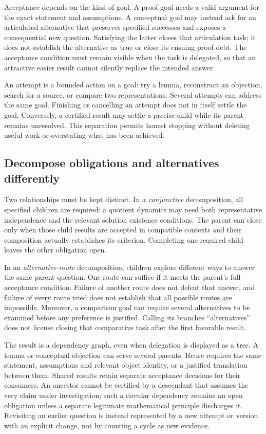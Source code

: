 Acceptance depends on the kind of goal. A proof goal needs a valid argument
for the exact statement and assumptions. A conceptual goal may instead ask for
an articulated alternative that preserves specified successes and exposes a
consequential new question. Satisfying the latter closes that articulation task;
it does not establish the alternative as true or close its ensuing proof debt.
The acceptance condition must remain visible when the task is delegated, so
that an attractive easier result cannot silently replace the intended answer.

An attempt is a bounded action on a goal: try a lemma, reconstruct an objection,
search for a source, or compare two representations. Several attempts can address
the same goal. Finishing or cancelling an attempt does not in itself settle the
goal. Conversely, a certified result may settle a precise child while its parent
remains unresolved. This separation permits honest stopping without deleting
useful work or overstating what has been achieved.

\subsection{Decompose obligations and alternatives differently}
Two relationships must be kept distinct. In a \emph{conjunctive} decomposition,
all specified children are required: a quotient dynamics may need both
representative independence and the relevant solution existence conditions.
The parent can close only when those child results are accepted in compatible
contexts and their composition actually establishes its criterion. Completing
one required child leaves the other obligation open.

In an \emph{alternative-route} decomposition, children explore different ways
to answer the same parent question. One route can suffice if it meets the
parent's full acceptance condition. Failure of another route does not defeat
that answer, and failure of every route tried does not establish that all
possible routes are impossible. Moreover, a comparison goal can require several
alternatives to be examined before any preference is justified. Calling its
branches ``alternatives'' does not license closing that comparative task after
the first favorable result.

The result is a dependency graph, even when delegation is displayed as a tree.
A lemma or conceptual objection can serve several parents. Reuse requires the
same statement, assumptions and relevant object identity, or a justified
translation between them. Shared results retain separate acceptance decisions
for their consumers. An ancestor cannot be certified by a descendant that
assumes the very claim under investigation; such a circular dependency remains
an open obligation unless a separate legitimate mathematical principle discharges
it. Revisiting an earlier question is instead represented by a new attempt or
version with an explicit change, not by counting a cycle as new evidence.

